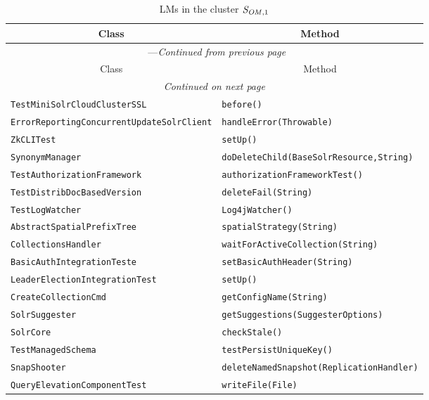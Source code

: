 \begin{center}
\begin{longtable}{ll}
\caption{LMs in the cluster $\mathit{S}_{\mathit{OM},1}$}\\
\toprule\multicolumn{1}{c}{Class}&\multicolumn{1}{c}{Method}\\\midrule
\endfirsthead

\multicolumn{2}{c}{\tablename\ \thetable{}---\textit{Continued from previous page}} \\\midrule
\multicolumn{1}{c}{Class}&\multicolumn{1}{c}{Method}\\\midrule
\endhead
\multicolumn{2}{c}{\textit{Continued on next page}}\\\midrule
\endfoot
\bottomrule
\endlastfoot

\lstinline/TestMiniSolrCloudClusterSSL/&{\lstinline/before()/}\\
\lstinline/ErrorReportingConcurrentUpdateSolrClient/&{\lstinline/handleError(Throwable)/}\\
\lstinline/ZkCLITest/&{\lstinline/setUp()/}\\
\lstinline/SynonymManager/&{\lstinline/doDeleteChild(BaseSolrResource,String)/}\\
\lstinline/TestAuthorizationFramework/&{\lstinline/authorizationFrameworkTest()/}\\
\lstinline/TestDistribDocBasedVersion/&{\lstinline/deleteFail(String)/}\\
\lstinline/TestLogWatcher/&{\lstinline/Log4jWatcher()/}\\
\lstinline/AbstractSpatialPrefixTree/&{\lstinline/spatialStrategy(String)/}\\
\lstinline/CollectionsHandler/&{\lstinline/waitForActiveCollection(String)/}\\
\lstinline/BasicAuthIntegrationTeste/&{\lstinline/setBasicAuthHeader(String)/}\\
\lstinline/LeaderElectionIntegrationTest/&{\lstinline/setUp()/}\\
\lstinline/CreateCollectionCmd/&{\lstinline/getConfigName(String)/}\\
\lstinline/SolrSuggester/&{\lstinline/getSuggestions(SuggesterOptions)/}\\
\lstinline/SolrCore/&{\lstinline/checkStale()/}\\
\lstinline/TestManagedSchema/&{\lstinline/testPersistUniqueKey()/}\\
\lstinline/SnapShooter/&{\lstinline/deleteNamedSnapshot(ReplicationHandler)/}\\
\lstinline/QueryElevationComponentTest/&{\lstinline/writeFile(File)/}\\

\end{longtable}
\end{center}
